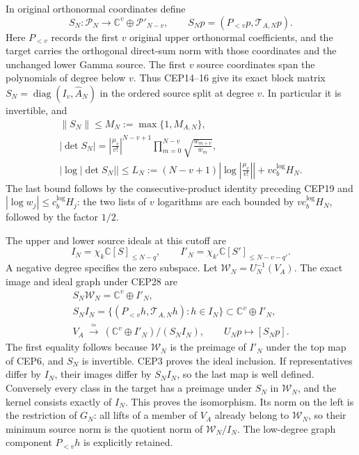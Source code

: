 \documentclass[11pt,a4paper]{article}
\begin{document}
In original orthonormal coordinates define
\[
 S_N:\mathcal P_N\longrightarrow
         \mathbb C^v\oplus\mathcal P'_{N-v},\qquad
 S_Np=(P_{<v}p,\mathcal T_{A,N}p).
 \tag{CEP28}
\]
Here $P_{<v}$ records the first $v$ original upper orthonormal
coefficients, and the target carries the orthogonal direct-sum norm
with those coordinates and the unchanged lower Gamma source.
The first $v$ source coordinates span the polynomials of degree
below $v$. Thus CEP14--16 give its exact block matrix
$S_N=\operatorname{diag}(I_v,\widehat A_N)$ in the ordered
source split at degree $v$. In particular it is invertible, and
\[
 \begin{gathered}
 \|S_N\|\le M_N:=\max\{1,M_{A,N}\},\\
 |\det S_N|=\left|\frac{\mu_v}{v!}\right|^{N-v+1}
              \prod_{m=0}^{N-v}\sqrt{\frac{w_{m+v}}{w_m}},\\
 |\log|\det S_N||
 \le L_N:=(N-v+1)\left|\log\left|\frac{\mu_v}{v!}\right|\right|
                      +v c_b^{\log}H_N .
 \end{gathered}\tag{CEP29}
\]
The last bound follows by the consecutive-product identity preceding
CEP19 and $|\log w_j|\le c_b^{\log}H_j$: the two lists of $v$
logarithms are each bounded by $v c_b^{\log}H_N$, followed by
the factor $1/2$.

The upper and lower source ideals at this cutoff are
\[
 I_N=\chi_k\mathbb C[S]_{\le N-q},\qquad
 I'_N=\chi_{k'}\mathbb C[S']_{\le N-v-q'} .
 \tag{CEP30}
\]
A negative degree specifies the zero subspace.
Let $\mathcal W_N=U_N^{-1}(V_A)$. The exact image and ideal graph
under CEP28 are
\[
 \begin{gathered}
 S_N\mathcal W_N=\mathbb C^v\oplus I'_N,\\
 S_N I_N=\{(P_{<v}h,\mathcal T_{A,N}h):h\in I_N\}
                    \subset\mathbb C^v\oplus I'_N,\\
 V_A\ \xrightarrow{\ \simeq\ }\
   (\mathbb C^v\oplus I'_N)/(S_N I_N),\qquad
 U_Np\longmapsto[S_Np].
 \end{gathered}\tag{CEP31}
\]
The first equality follows because $\mathcal W_N$ is the preimage
of $I'_N$ under the top map of CEP6, and $S_N$ is invertible.
CEP3 proves the ideal inclusion. If representatives differ by
$I_N$, their images differ by $S_NI_N$, so the last map is
well defined. Conversely every class in the target has a preimage
under $S_N$ in $\mathcal W_N$, and the kernel consists exactly
of $I_N$. This proves the isomorphism. Its norm on the left is
the restriction of $G_N$: all lifts of a member of $V_A$ already
belong to $\mathcal W_N$, so their minimum source norm is the
quotient norm of $\mathcal W_N/I_N$.
The low-degree graph component $P_{<v}h$ is explicitly retained.
\end{document}

